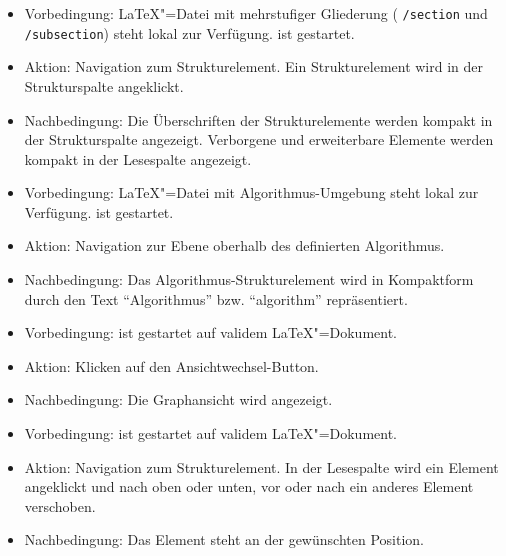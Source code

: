 \begin{itemize}
  \item Vorbedingung: \LaTeX"=Datei mit mehrstufiger Gliederung (\zB{} \verb|/section| und \verb|/subsection|) steht
  lokal zur Verfügung.
  \texla{} ist gestartet.
  \item Aktion: Navigation zum Strukturelement.
  Ein Strukturelement wird in der Strukturspalte angeklickt.
  \item Nachbedingung: Die Überschriften der Strukturelemente werden kompakt in der Strukturspalte angezeigt.
  Verborgene und erweiterbare Elemente werden kompakt in der Lesespalte angezeigt.
\end{itemize}

\begin{itemize}
  \item Vorbedingung: \LaTeX"=Datei mit Algorithmus-Umgebung steht lokal zur Verfügung.
  \texla{} ist gestartet.
  \item Aktion: Navigation zur Ebene oberhalb des definierten Algorithmus.
  \item Nachbedingung: Das Algorithmus-Strukturelement wird in Kompaktform durch den Text \enquote{Algorithmus} bzw.
  \enquote{algorithm} repräsentiert.
\end{itemize}

\begin{itemize}
  \item Vorbedingung: \texla{} ist gestartet auf validem \LaTeX"=Dokument.
  \item Aktion: Klicken auf den Ansichtwechsel-Button.
  \item Nachbedingung: Die Graphansicht wird angezeigt.
\end{itemize}

\begin{itemize}
  \item Vorbedingung: \texla{} ist gestartet auf validem \LaTeX"=Dokument.
  \item Aktion: Navigation zum Strukturelement.
  In der Lesespalte wird ein Element angeklickt und nach oben oder unten, vor oder nach ein anderes Element
  verschoben.
  \item Nachbedingung: Das Element steht an der gewünschten Position.
\end{itemize}

